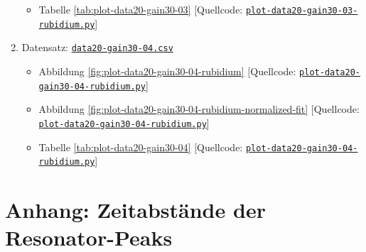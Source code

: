 \begin{appendix}
\begin{enumerate}[1.]
\begin{itemize}
        \item Tabelle \ref{tab:plot-data20-gain30-03} [Quellcode: \href{https://github.com/DaHaCoder/H2-Auswertung/blob/main/code/plot-data20-gain30-03-rubidium.py}{\lstinline{plot-data20-gain30-03-rubidium.py}}]
    \end{itemize}
    \item Datensatz: \href{https://github.com/DaHaCoder/H2-Auswertung/blob/main/data/data20-gain30-04.csv}{\lstinline{data20-gain30-04.csv}}
    \begin{itemize}
        \item Abbildung \ref{fig:plot-data20-gain30-04-rubidium} [Quellcode: \href{https://github.com/DaHaCoder/H2-Auswertung/blob/main/code/plot-data20-gain30-04-rubidium.py}{\lstinline{plot-data20-gain30-04-rubidium.py}}]
        \item Abbildung \ref{fig:plot-data20-gain30-04-rubidium-normalized-fit} [Quellcode: \href{https://github.com/DaHaCoder/H2-Auswertung/blob/main/code/plot-data20-gain30-04-rubidium.py}{\lstinline{plot-data20-gain30-04-rubidium.py}}]
        \item Tabelle \ref{tab:plot-data20-gain30-04} [Quellcode: \href{https://github.com/DaHaCoder/H2-Auswertung/blob/main/code/plot-data20-gain30-04-rubidium.py}{\lstinline{plot-data20-gain30-04-rubidium.py}}]
    \end{itemize}
\end{enumerate}

\cleardoublepage{}

\chapter{Anhang: Zeitabstände der Resonator-Peaks}
\label{app:time-to-freq}


\end{appendix}
